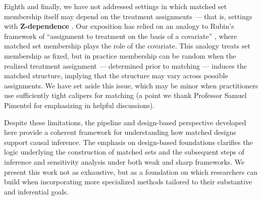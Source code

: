\documentclass[
  12pt,
  leqno]{article}
\begin{document}
\begin{itemize}
  Eighth and finally, we have not addressed settings in which matched
  set membership itself may depend on the treatment assignments --- that
  is, settings with \textbf{\(\bm{Z}\)-dependence}
  \citep{pashleyetal2021, pimentelhuang2024, pimentelyu2024}. Our
  exposition has relied on an analogy to Rubin's framework of
  ``assignment to treatment on the basis of a covariate''
  \citep{rubin1977}, where matched set membership plays the role of the
  covariate. This analogy treats set membership as fixed, but in
  practice membership can be random when the realized treatment
  assignment --- determined prior to matching --- induces the matched
  structure, implying that the structure may vary across possible
  assignments. We have set aside this issue, which may be minor when
  practitioners use sufficiently tight calipers for matching (a point we
  thank Professor Samuel Pimentel for emphasizing in helpful
  discussions).
\end{itemize}

Despite these limitations, the pipeline and design-based perspective
developed here provide a coherent framework for understanding how
matched designs support causal inference. The emphasis on design-based
foundations clarifies the logic underlying the construction of matched
sets and the subsequent steps of inference and sensitivity analysis
under both weak and sharp frameworks. We present this work not as
exhaustive, but as a foundation on which researchers can build when
incorporating more specialized methods tailored to their substantive and
inferential goals.

\newpage


\end{document}
